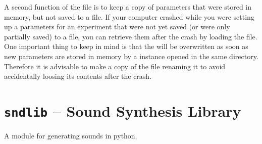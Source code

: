 \documentclass[a4paper,12pt,english]{sphinxmanual}
\begin{document}
A second function of the  file is to keep a copy of
parameters that were stored in memory, but not saved to a file. If your
computer crashed while you were setting up a parameters for an
experiment that were not yet saved (or were only partially saved) to a
file, you can retrieve them after the crash by loading the
 file. One important thing to keep in mind is that the
 will be overwritten as soon as new parameters are
stored in memory by a  instance opened in the same
directory. Therefore it is advisable to make a copy of the
 file renaming it to avoid accidentally loosing its
contents after the crash.


\chapter{\texttt{sndlib} -- Sound Synthesis Library}
\label{sndlib:module-sndlib}\label{sndlib::doc}\label{sndlib:sndlib-sound-synthesis-library}
A module for generating sounds in python.
\end{document}
